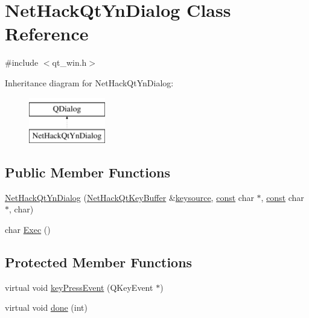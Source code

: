 \hypertarget{classNetHackQtYnDialog}{\section{Net\+Hack\+Qt\+Yn\+Dialog Class Reference}
\label{classNetHackQtYnDialog}
}


{\ttfamily \#include $<$qt\+\_\+win.\+h$>$}

Inheritance diagram for Net\+Hack\+Qt\+Yn\+Dialog\+:\begin{figure}[H]
\begin{center}
\leavevmode
\includegraphics[height=2.000000cm]{classNetHackQtYnDialog}
\end{center}
\end{figure}
\subsection*{Public Member Functions}
\begin{DoxyCompactItemize}
\item 
\hyperlink{classNetHackQtYnDialog_ad05a1e4c76d97074123f28b74c5845a0}{Net\+Hack\+Qt\+Yn\+Dialog} (\hyperlink{classNetHackQtKeyBuffer}{Net\+Hack\+Qt\+Key\+Buffer} \&\hyperlink{classNetHackQtYnDialog_a67f46f40a36ccf10f4209cbd6d5f85d8}{keysource}, \hyperlink{tradstdc_8h_a2c212835823e3c54a8ab6d95c652660e}{const} char $\ast$, \hyperlink{tradstdc_8h_a2c212835823e3c54a8ab6d95c652660e}{const} char $\ast$, char)
\item 
char \hyperlink{classNetHackQtYnDialog_aeec398f6e50f3666850b9ed60dcf850e}{Exec} ()
\end{DoxyCompactItemize}
\subsection*{Protected Member Functions}
\begin{DoxyCompactItemize}
\item 
virtual void \hyperlink{classNetHackQtYnDialog_ac3b3aba8bf4d8d14889fbe808bcef560}{key\+Press\+Event} (Q\+Key\+Event $\ast$)
\item 
virtual void \hyperlink{classNetHackQtYnDialog_a6d20c1592d8d2ab5dad70924d5f05526}{done} (int)
\end{DoxyCompactItemize}
